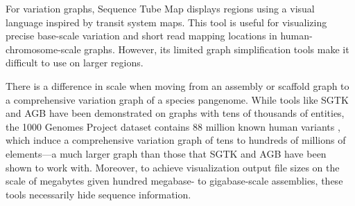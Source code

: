 
For variation graphs, Sequence Tube Map \cite{Beyer_2019} displays regions using a visual language inspired by transit system maps.
This tool is useful for visualizing precise base-scale variation and short read mapping locations in human-chromosome-scale graphs.
However, its limited graph simplification tools make it difficult to use on larger regions.

There is a difference in scale when moving from an assembly or scaffold graph to a comprehensive variation graph of a species pangenome.
While tools like SGTK and AGB have been demonstrated on graphs with tens of thousands of entities, the 1000 Genomes Project dataset contains 88 million known human variants \citep{1000_2015}, which induce a comprehensive variation graph of tens to hundreds of millions of elements---a much larger graph than those that SGTK and AGB have been shown to work with.
Moreover, to achieve visualization output file sizes on the scale of megabytes given hundred megabase- to gigabase-scale assemblies, these tools necessarily hide sequence information.




